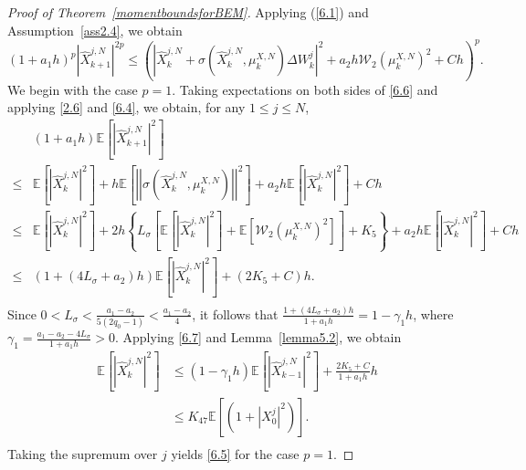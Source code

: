 \documentclass[12pt]{article}
\numberwithin{equation}{section}
\begin{document}
\begin{proof}[Proof of Theorem~\ref{momentboundsforBEM}]
Applying (\ref{6.1}) and Assumption~\ref{ass2.4}, we obtain
\begin{equation}\tag{5.110}\label{6.6}
\left( 1+a_1h \right) ^p\left| \hat{X}_{k+1}^{j,N} \right|^{2p}\le \left( \left| \hat{X}_{k}^{j,N}+\sigma \left( \hat{X}_{k}^{j,N},\mu _{k}^{X,N} \right) \Delta W_{k}^{j} \right|^2+a_2h\mathcal{W} _2\left( \mu _{k}^{X,N} \right) ^2+Ch \right) ^p.
\end{equation}
We begin with the case $ p = 1 $. Taking expectations on both sides of \eqref{6.6} and applying \eqref{2.6} and \eqref{6.4}, we obtain, for any $ 1 \leq j \leq N $,
\begin{equation}\tag{5.111}\label{6.7}
\begin{aligned}
&\left( 1+a_1h \right) \mathbb{E} \left[ \left| \hat{X}_{k+1}^{j,N} \right|^2 \right] \\
\le &\mathbb{E} \left[ \left| \hat{X}_{k}^{j,N} \right|^2 \right] +h\mathbb{E} \left[ \left|\left| \sigma \left( \hat{X}_{k}^{j,N},\mu _{k}^{X,N} \right) \right|\right| ^2 \right] +a_2h\mathbb{E} \left[ \left| \hat{X}_{k}^{j,N} \right|^2 \right] +Ch
\\
\le &\mathbb{E} \left[ \left| \hat{X}_{k}^{j,N} \right|^2 \right] +2h\left\{ L_{\sigma}\left[ \mathbb{E} \left[ \left|\hat{X}_{k}^{j,N}\right|^2 \right] +\mathbb{E} \left[ \mathcal{W} _2\left( \mu _{k}^{X,N} \right) ^2 \right] \right] +K_5 \right\} +a_2h\mathbb{E} \left[ \left| \hat{X}_{k}^{j,N} \right|^2 \right] +Ch
\\
\le &\left( 1+\left( 4L_{\sigma}+a_2 \right) h \right) \mathbb{E} \left[ \left| \hat{X}_{k}^{j,N} \right|^2 \right] +\left( 2K_5+C \right) h.\\
\end{aligned}
\end{equation}
Since $0<L_{\sigma}<\tfrac{a_1-a_2}{5\left( 2q_0-1 \right)}<\tfrac{a_1-a_2}{4}$, it follows that $\tfrac{1+\left( 4L_{\sigma}+a_2 \right) h}{1+a_1h}=1-\gamma_{1} h$, where $\gamma_{1} =\tfrac{a_1-a_2-4L_{\sigma}}{1+a_1h}>0$. Applying \eqref{6.7} and Lemma~\ref{lemma5.2}, we obtain
\begin{equation}\tag{5.112}\label{6.8}
\begin{aligned}
	\mathbb{E} \left[ \left| \hat{X}_{k}^{j,N} \right|^2 \right] &\le \left(1-\gamma_{1} h\right)\mathbb{E} \left[ \left| \hat{X}_{k-1}^{j,N} \right|^2 \right] +\tfrac{2K_5+C}{1+a_1h}h\\
	&\le K_{47}\mathbb{E} \left[ \left( 1+\left| X^{j}_0 \right|^2 \right) \right].\\
\end{aligned}
\end{equation}
Taking the supremum over $ j $ yields \eqref{6.5} for the case $ p = 1 $.


\end{proof}
\end{document}
